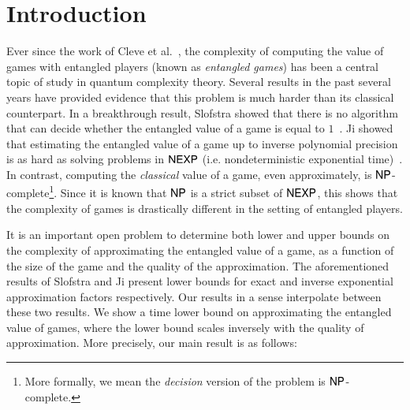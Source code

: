 \section{Introduction}

Ever since the work of Cleve et al.~\cite{cleve2004consequences}, the complexity of computing the value of games with entangled players (known as \emph{entangled games}) has been a central topic of study in quantum complexity theory. Several results in the past several years have provided evidence that this problem is much harder than its classical counterpart. In a breakthrough result, Slofstra showed that there is no algorithm that can decide whether the entangled value of a game is equal to $1$~\cite{slofstra2017set}. Ji showed that estimating the entangled value of a game up to inverse polynomial precision is as hard as solving problems in ${\sf NEXP}$ (i.e. nondeterministic exponential time)~\cite{ji2016compression}. In contrast, computing the \emph{classical} value of a game, even approximately, is ${\sf NP}$-complete\footnote{More formally, we mean the \emph{decision} version of the problem is ${\sf NP}$-complete.}. Since it is known that ${\sf NP}$ is a strict subset of ${\sf NEXP}$, this shows that the complexity of games is drastically different in the setting of entangled players. 

It is an important open problem to determine both lower and upper bounds on the complexity of approximating the entangled value of a game, as a function of the size of the game and the quality of the approximation. 
The aforementioned results of Slofstra and Ji present lower bounds for exact and inverse exponential approximation factors respectively. Our results in a sense interpolate between these two results. We show a time lower bound on approximating the entangled value of games, where the lower bound scales inversely with the quality of approximation. More precisely, our main result is as follows:

